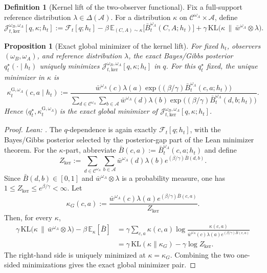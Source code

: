 \documentclass[11pt]{article}
\newtheorem{proposition}[theorem]{Proposition}
\theoremstyle{definition}
\newtheorem{definition}[theorem]{Definition}
\theoremstyle{remark}
\theoremstyle{plain}
\theoremstyle{definition}
\newcommand{\Acal}{\mathcal{A}}
\newcommand{\Ccal}{\mathcal{C}}
\newcommand{\E}{\mathbb{E}}
\newcommand{\KL}{\mathrm{KL}}
\begin{document}
\begin{definition}[Kernel lift of the two-observer functional]
\label{def:kernel-functional}
Fix a full-support reference distribution $\lambda\in\Delta(\Acal)$. For a distribution $\kappa$ on $\Ccal^{\omega_A}\times\Acal$, define
\[
\mathcal J_{t,\mathrm{ker}}^{\omega_B,\omega_A}[q,\kappa;h_t]
:=
\mathcal F_t[q;h_t]
-\beta\,\E_{(C,A)\sim\kappa}\!\bigl[\bar B_t^{\omega_A}(C,A;h_t)\bigr]
+\gamma\,\KL\!\bigl(\kappa\,\|\,\bar w^{\omega_A}\otimes\lambda\bigr).
\]
\end{definition}

\begin{proposition}[Exact global minimizer of the kernel lift]
\label{prop:kernel-functional-minimizer}
For fixed $h_t$, observers $(\omega_B,\omega_A)$, and reference distribution $\lambda$, the exact Bayes/Gibbs posterior $q_t^\star(\cdot\mid h_t)$ uniquely minimizes $\mathcal J_{t,\mathrm{ker}}^{\omega_B,\omega_A}[q,\kappa;h_t]$ in $q$. For this $q_t^\star$ fixed, the unique minimizer in $\kappa$ is
\[
\kappa_t^{\mathrm G,\omega_A}(c,a\mid h_t)
:=
\frac{\bar w^{\omega_A}(c)\lambda(a)\exp\!\bigl((\beta/\gamma)\bar B_t^{\omega_A}(c,a;h_t)\bigr)}
{\sum_{d\in\Ccal^{\omega_A}}\sum_{b\in\Acal}\bar w^{\omega_A}(d)\lambda(b)\exp\!\bigl((\beta/\gamma)\bar B_t^{\omega_A}(d,b;h_t)\bigr)}.
\]
Hence $\bigl(q_t^\star,\kappa_t^{\mathrm G,\omega_A}\bigr)$ is the exact global minimizer of $\mathcal J_{t,\mathrm{ker}}^{\omega_B,\omega_A}[q,\kappa;h_t]$.
\end{proposition}

\begin{proof}
\noindent\emph{Lean: .}
The $q$-dependence is again exactly $\mathcal F_t[q;h_t]$, with the Bayes/Gibbs posterior selected by the posterior-gap part of the Lean minimizer theorem. For the $\kappa$-part, abbreviate $\bar B(c,a):=\bar B_t^{\omega_A}(c,a;h_t)$ and define
\[
Z_{\mathrm{ker}}
:=
\sum_{d\in\Ccal^{\omega_A}}\sum_{b\in\Acal}\bar w^{\omega_A}(d)\lambda(b)e^{(\beta/\gamma)\bar B(d,b)}.
\]
Since $\bar B(d,b)\in[0,1]$ and $\bar w^{\omega_A}\otimes\lambda$ is a probability measure, one has $1\le Z_{\mathrm{ker}}\le e^{\beta/\gamma}<\infty$. Let
\[
\kappa_G(c,a):=
\frac{\bar w^{\omega_A}(c)\lambda(a)e^{(\beta/\gamma)\bar B(c,a)}}{Z_{\mathrm{ker}}}.
\]
Then, for every $\kappa$,
\begin{align*}
\gamma\,\KL\!\bigl(\kappa\,\|\,\bar w^{\omega_A}\otimes\lambda\bigr)-\beta\,\E_\kappa[\bar B]
&=\gamma\sum_{c,a}\kappa(c,a)\log\frac{\kappa(c,a)}{\bar w^{\omega_A}(c)\lambda(a)e^{(\beta/\gamma)\bar B(c,a)}}\\
&=\gamma\,\KL(\kappa\|\kappa_G)-\gamma\log Z_{\mathrm{ker}}.
\end{align*}
The right-hand side is uniquely minimized at $\kappa=\kappa_G$. Combining the two one-sided minimizations gives the exact global minimizer pair.
\end{proof}
\end{document}
